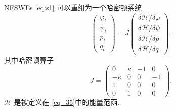 \begin{thm}\label{thm2}
NFSWEs \eqref{eq:s1} 可以重组为一个哈密顿系统
\begin{equation}\label{eq_37}
	\left(\begin{array}{l}
		\varphi_{t} \\
		\psi_{t} \\
		p_{t} \\
		q_{t}
		\end{array}\right)=J\left(\begin{array}{l}
		\delta \mathcal{H} / \delta \varphi \\
		\delta \mathcal{H} / \delta \psi \\
		\delta \mathcal{H} / \delta p \\
		\delta \mathcal{H} / \delta q
		\end{array}\right),
\end{equation}
其中哈密顿算子
\begin{equation}\label{eq_37b}
J=\left(\begin{array}{cccc}
		0 & \kappa & -1 & 0 \\
		-\kappa & 0 & 0 & -1 \\
		1 & 0 & 0 & 0 \\
		0 & 1 & 0 & 0
		\end{array}\right),
\end{equation}
 $\mathcal{H}$ 是被定义在 \eqref{eq_35}中的能量范函.
\end{thm}

